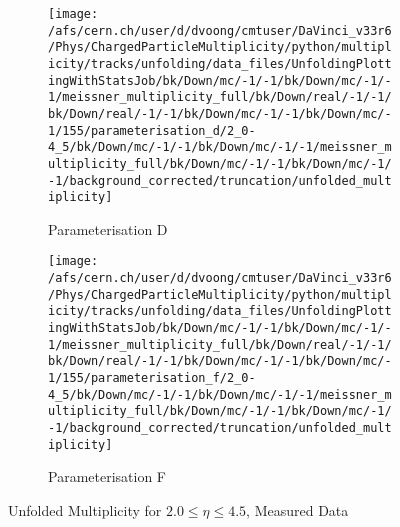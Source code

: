 \begin{figure}[H]
	\begin{subfigure}{0.49\textwidth}
		\texttt{[image: /afs/cern.ch/user/d/dvoong/cmtuser/DaVinci\_v33r6/Phys/ChargedParticleMultiplicity/python/multiplicity/tracks/unfolding/data\_files/UnfoldingPlottingWithStatsJob/bk/Down/mc/-1/-1/bk/Down/mc/-1/-1/meissner\_multiplicity\_full/bk/Down/real/-1/-1/bk/Down/real/-1/-1/bk/Down/mc/-1/-1/bk/Down/mc/-1/155/parameterisation\_d/2\_0-4\_5/bk/Down/mc/-1/-1/bk/Down/mc/-1/-1/meissner\_multiplicity\_full/bk/Down/mc/-1/-1/bk/Down/mc/-1/-1/background\_corrected/truncation/unfolded\_multiplicity]}
		\caption{Parameterisation D}
	\end{subfigure}
	\begin{subfigure}{0.49\textwidth}
		\texttt{[image: /afs/cern.ch/user/d/dvoong/cmtuser/DaVinci\_v33r6/Phys/ChargedParticleMultiplicity/python/multiplicity/tracks/unfolding/data\_files/UnfoldingPlottingWithStatsJob/bk/Down/mc/-1/-1/bk/Down/mc/-1/-1/meissner\_multiplicity\_full/bk/Down/real/-1/-1/bk/Down/real/-1/-1/bk/Down/mc/-1/-1/bk/Down/mc/-1/155/parameterisation\_f/2\_0-4\_5/bk/Down/mc/-1/-1/bk/Down/mc/-1/-1/meissner\_multiplicity\_full/bk/Down/mc/-1/-1/bk/Down/mc/-1/-1/background\_corrected/truncation/unfolded\_multiplicity]}
		\caption{Parameterisation F}
	\end{subfigure}
	\caption{Unfolded Multiplicity for $2.0 \le \eta \le 4.5$, Measured Data}
	\label{fig: unfolded multiplicity, measured data}
\end{figure}
%
